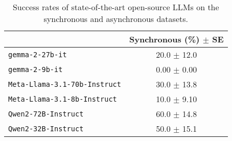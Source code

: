 
\begin{table}[h]
    \small
    \centering
    \begin{tabular}{lc}
        \toprule
        & \textbf{Synchronous (\%) $\pm$ SE} \\ 
        \midrule
        \texttt{gemma-2-27b-it} & 20.0 $\pm$ 12.0 \\
        \texttt{gemma-2-9b-it} & 0.00 $\pm$ 0.00 \\
        \texttt{Meta-Llama-3.1-70b-Instruct} & 30.0 $\pm$ 13.8 \\
        \texttt{Meta-Llama-3.1-8b-Instruct} & 10.0 $\pm$ 9.10 \\
        \texttt{Qwen2-72B-Instruct} & 60.0 $\pm$ 14.8 \\
        \texttt{Qwen2-32B-Instruct} & 50.0 $\pm$ 15.1 \\
        \bottomrule
    \end{tabular}
    \caption{Success rates of state-of-the-art open-source LLMs on the synchronous and asynchronous datasets.}
    \label{tab:open-source}
\end{table}